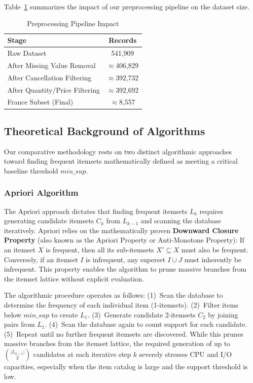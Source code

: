 \documentclass[conference]{IEEEtran}
\begin{document}
Table~\ref{tab:preprocessing} summarizes the impact of our preprocessing pipeline on the dataset size.

\begin{table}[htbp]
\caption{Preprocessing Pipeline Impact}
\begin{center}
\renewcommand{\arraystretch}{1.2}
\begin{tabular}{@{}lc@{}}
\toprule
\textbf{Stage} & \textbf{Records} \\
\midrule
Raw Dataset & 541,909 \\
After Missing Value Removal & $\approx$406,829 \\
After Cancellation Filtering & $\approx$392,732 \\
After Quantity/Price Filtering & $\approx$392,692 \\
France Subset (Final) & $\approx$8,557 \\
\bottomrule
\end{tabular}
\label{tab:preprocessing}
\end{center}
\end{table}

\subsection{Theoretical Background of Algorithms}
Our comparative methodology rests on two distinct algorithmic approaches toward finding frequent itemsets mathematically defined as meeting a critical baseline threshold $min\_sup$.

\subsubsection{Apriori Algorithm}
The Apriori approach dictates that finding frequent itemsets $L_k$ requires generating candidate itemsets $C_k$ from $L_{k-1}$ and scanning the database iteratively. Apriori relies on the mathematically proven \textbf{Downward Closure Property} (also known as the Apriori Property or Anti-Monotone Property): If an itemset $X$ is frequent, then all its sub-itemsets $X' \subseteq X$ must also be frequent. Conversely, if an itemset $I$ is infrequent, any superset $I \cup J$ must inherently be infrequent. This property enables the algorithm to prune massive branches from the itemset lattice without explicit evaluation.

The algorithmic procedure operates as follows: (1)~Scan the database to determine the frequency of each individual item (1-itemsets). (2)~Filter items below $min\_sup$ to create $L_1$. (3)~Generate candidate 2-itemsets $C_2$ by joining pairs from $L_1$. (4)~Scan the database again to count support for each candidate. (5)~Repeat until no further frequent itemsets are discovered. While this prunes massive branches from the itemset lattice, the required generation of up to $\binom{|L_{k-1}|}{2}$ candidates at each iterative step $k$ severely stresses CPU and I/O capacities, especially when the item catalog is large and the support threshold is low.
\end{document}

